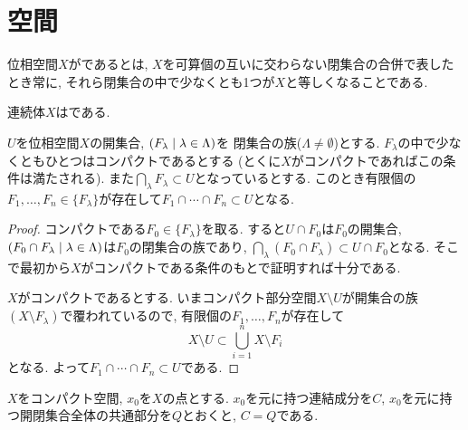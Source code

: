 \documentclass[uplatex, dvipdfmx, a4paper, 12pt, class=jsbook, crop=false]{standalone}
\begin{document}
\section{\sigmaConnected 空間}
\label{sec:sigma-connected-spaces}

\newcommand{\loclabel}[1]{\label{LocalLabel-\thepart-\thechapter-\thesection:#1}}
\newcommand{\locref}[1]{\ref{LocalLabel-\thepart-\thechapter-\thesection:#1}}
\newcommand{\longrel}[1]{\ #1\ }

\begin{definition}
	位相空間$ X $がであるとは,
	$ X $を可算個の互いに交わらない閉集合の合併で表したとき常に,
	それら閉集合の中で少なくとも1つが$ X $と等しくなることである.
\end{definition}

\begin{theorem}
	\label{thm:Sierpinski_continuum}
	連続体$X$は\sigmaConnected である.
\end{theorem}

\begin{lemma}
	\loclabel{lemma:1}
	$ U $を位相空間$ X $の開集合, $ \setfamily{F_\lambda}{\lambda \in \Lambda} $を
	閉集合の族($ \Lambda \neq \emptyset $)とする.
	$ F_\lambda $の中で少なくともひとつはコンパクトであるとする
	(とくに$ X $がコンパクトであればこの条件は満たされる).
	また$ \bigcap_{\lambda} F_\lambda \subset U$となっているとする.
	このとき有限個の$ F_1, \ldots , F_n \in \{ F_\lambda\}$が存在して$ F_1 \cap \cdots \cap F_n \subset U $となる.
\end{lemma}

\begin{proof}
	コンパクトである$ F_0 \in \{F_\lambda\}$を取る.
	すると$ U \cap F_0 $は$ F_0 $の開集合,
	$ \setfamily{F_0 \cap F_\lambda}{\lambda \in \Lambda} $は$ F_0 $の閉集合の族であり,
	$ \bigcap_{\lambda} (F_0 \cap F_\lambda) \subset U \cap F_0 $となる.
	そこで最初から$ X $がコンパクトである条件のもとで証明すれば十分である.

	$ X $がコンパクトであるとする.
	いまコンパクト部分空間$ X \setminus U $が開集合の族$ (X \setminus F_\lambda) $で覆われているので,
	有限個の$ F_1, \ldots, F_n $が存在して
	\[ X \setminus U \subset \bigcup_{i=1}^{n} X \setminus F_i \]
	となる. よって$ F_1 \cap \cdots \cap F_n \subset U $である.
\end{proof}

\begin{lemma}
	\loclabel{lemma:2}
	$ X $をコンパクト\Hausdorff 空間, $ x_0 $を$ X $の点とする.
	$ x_0 $を元に持つ連結成分を$ C $, $ x_0 $を元に持つ開閉集合全体の共通部分を$ Q $とおくと, $ C = Q $である.
\end{lemma}
\end{document}
